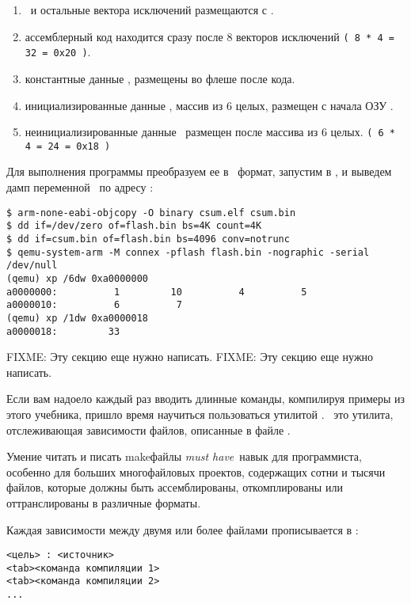 \begin{enumerate}
  \item 
{}\ и остальные вектора исключений размещаются с .
  \item 
ассемблерный код находится сразу после 8 векторов исключений 
    \verb|( 8 * 4 = 32 = 0x20 )|.
  \item 
константные данные , размещены во флеше после кода.
  \item 
инициализированные данные , массив из 6 целых, размещен
    с начала ОЗУ .
  \item 
неинициализированные данные \ размещен после массива из 6 целых.
    \verb|( 6 * 4 = 24 = 0x18 )|
\end{enumerate}

Для выполнения программы преобразуем ее в \ формат, запустим в
\qemu, и выведем дамп переменной \ по адресу :

\begin{verbatim}
$ arm-none-eabi-objcopy -O binary csum.elf csum.bin
$ dd if=/dev/zero of=flash.bin bs=4K count=4K
$ dd if=csum.bin of=flash.bin bs=4096 conv=notrunc
$ qemu-system-arm -M connex -pflash flash.bin -nographic -serial /dev/null
(qemu) xp /6dw 0xa0000000
a0000000:          1         10          4          5
a0000010:          6          7
(qemu) xp /1dw 0xa0000018
a0000018:         33
\end{verbatim}

\secup
{} FIXME: Эту секцию еще нужно написать.
 FIXME: Эту секцию еще нужно написать.

\secdown\label{make}

Если вам надоело каждый раз вводить длинные команды, компилируя примеры из этого
учебника, пришло время научиться пользоваться утилитой .
\ это утилита, отслеживающая зависимости файлов, описанные в файле
.

Умение читать и писать makeфайлы \emph{must have}\ навык для программиста,
особенно для больших многофайловых проектов, содержащих сотни и тысячи файлов,
которые должны быть ассемблированы, откомплированы или оттранслированы в
различные форматы.

Каждая зависимости между двумя или более файлами прописывается в
:

\begin{verbatim}
<цель> : <источник>
<tab><команда компиляции 1>
<tab><команда компиляции 2>
...
\end{verbatim}

